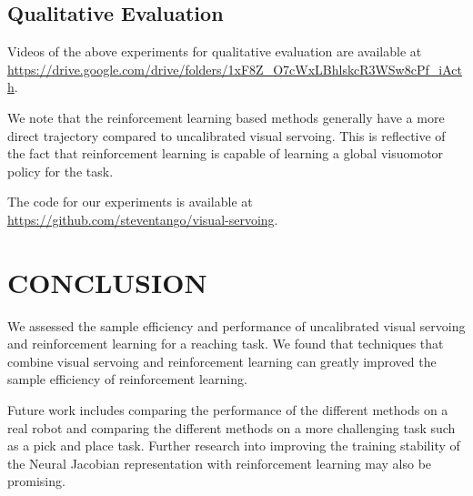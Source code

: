 \documentclass[letterpaper, 10 pt, conference]{ieeeconf}  %
\begin{document}
\subsection{Qualitative Evaluation}

Videos of the above experiments for qualitative evaluation are available at
\url{https://drive.google.com/drive/folders/1xF8Z_O7cWxLBhlskcR3WSw8cPf_iActh}.

We note that the reinforcement learning based methods generally have a more
direct trajectory compared to uncalibrated visual servoing. This is reflective
of the fact that reinforcement learning is capable of learning a global
visuomotor policy for the task.

The code for our experiments is available at
\url{https://github.com/steventango/visual-servoing}.

\section{CONCLUSION} \label{Conclusion}

We assessed the sample efficiency and performance of uncalibrated visual
servoing and reinforcement learning for a reaching task. We found that
techniques that combine visual servoing and reinforcement learning can greatly
improved the sample efficiency of reinforcement learning.

Future work includes comparing the performance of the different methods on a
real robot and comparing the different methods on a more challenging task such
as a pick and place task. Further research into improving the training stability
of the Neural Jacobian representation with reinforcement learning may also be
promising.


\end{document}
